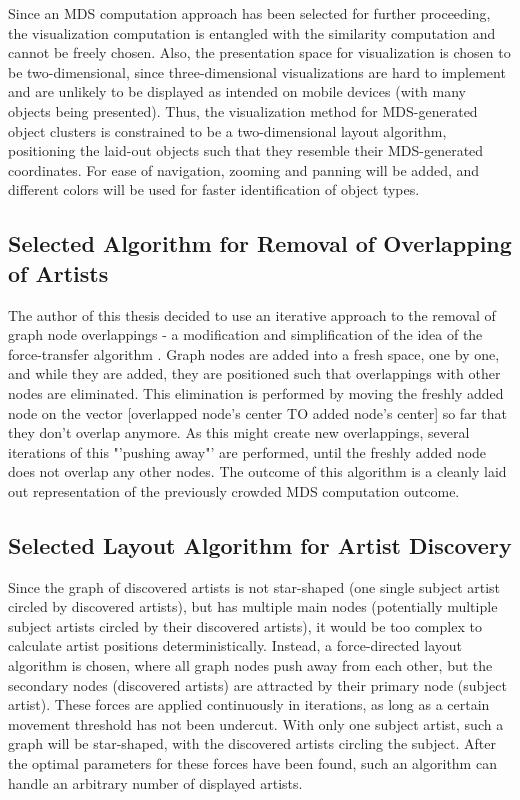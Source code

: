 Since an MDS computation approach has been selected for further proceeding, the visualization computation is entangled with the similarity computation and cannot be freely chosen. Also, the presentation space for visualization is chosen to be two-dimensional, since three-dimensional visualizations are hard to implement and are unlikely to be displayed as intended on mobile devices (with many objects being presented). Thus, the visualization method for MDS-generated object clusters is constrained to be a two-dimensional layout algorithm, positioning the laid-out objects such that they resemble their MDS-generated coordinates. For ease of navigation, zooming and panning will be added, and different colors will be used for faster identification of object types.

\subsection{Selected Algorithm for Removal of Overlapping of Artists}

The author of this thesis decided to use an iterative approach to the removal of graph node overlappings - a modification and simplification of the idea of the force-transfer algorithm \cite{Huang03force-transfer:a}. Graph nodes are added into a fresh space, one by one, and while they are added, they are positioned such that overlappings with other nodes are eliminated. This elimination is performed by moving the freshly added node on the vector [overlapped node's center TO added node's center] so far that they don't overlap anymore. As this might create new overlappings, several iterations of this "'pushing away"' are performed, until the freshly added node does not overlap any other nodes. The outcome of this algorithm is a cleanly laid out representation of the previously crowded MDS computation outcome.

\subsection{Selected Layout Algorithm for Artist Discovery}

Since the graph of discovered artists is not star-shaped (one single subject artist circled by discovered artists), but has multiple main nodes (potentially multiple subject artists circled by their discovered artists), it would be too complex to calculate artist positions deterministically. Instead, a force-directed layout algorithm is chosen, where all graph nodes push away from each other, but the secondary nodes (discovered artists) are attracted by their primary node (subject artist). These forces are applied continuously in iterations, as long as a certain movement threshold has not been undercut. With only one subject artist, such a graph will be star-shaped, with the discovered artists circling the subject. After the optimal parameters for these forces have been found, such an algorithm can handle an arbitrary number of displayed artists.

